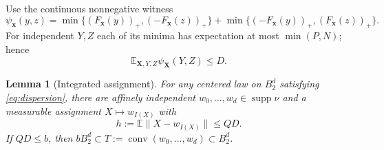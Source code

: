 \documentclass[11pt]{article}
\newtheorem{lemma}[theorem]{Lemma}
\newcommand{\conv}{\operatorname{conv}}
\newcommand{\supp}{\operatorname{supp}}
\newcommand{\EE}{\mathbb E}
\newcommand{\pos}[1]{(#1)_+}
\newcommand{\BB}{B_2^d}
\begin{document}
Use the continuous nonnegative witness
\[
 \psi_{\mathbf x}(y,z)
 =\min\{\pos{F_{\mathbf x}(y)},\pos{-F_{\mathbf x}(z)}\}
  +\min\{\pos{-F_{\mathbf x}(y)},\pos{F_{\mathbf x}(z)}\}.
\]
For independent $Y,Z$ each of its minima has expectation at most
$\min(P,N)$; hence
\begin{equation}\label{eq:witness}
 \EE_{\mathbf X,Y,Z}\psi_{\mathbf X}(Y,Z)\le D.
\end{equation}

\begin{lemma}[Integrated assignment]\label{lem:assignment}
For any centered law on $\BB$ satisfying \eqref{eq:dispersion}, there are
affinely independent $w_0,\ldots,w_d\in\supp\nu$ and a measurable assignment
$X\mapsto w_{I(X)}$ with
\[
 h:=\EE\|X-w_{I(X)}\|\le QD.
\]
If $QD\le b$, then $b\BB\subset T:=\conv(w_0,\ldots,w_d)\subset\BB$.
\end{lemma}
\end{document}
